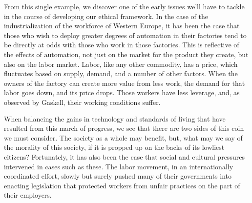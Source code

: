 \cite{marx1867strife}

From this single example, we discover one of the early issues we'll 
have to tackle in the course of developing our ethical framework.  
In the case of the industrialization of the workforce of Western 
Europe, it has been the case that those who wish to deploy greater 
degrees of automation in their factories tend to be directly at odds 
with those who work in those factories.  This is reflective of 
the effects of automation, not just on the market for the product they 
create, but also on the labor market.  Labor, like any other commodity, 
has a price, which fluctuates based on supply, demand, and a number of 
other factors.  When the owners of the factory can create more value 
from less work, the demand for that labor goes down, and its price 
drops.  Those workers have less leverage, and, as observed by Gaskell, 
their working conditions suffer.

When balancing the gains in technology and standards of living that 
have resulted from this march of progress, we see that there are two 
sides of this coin we must consider.  The society as a whole may 
benefit, but, what may we say of the morality of this society, if it 
is propped up on the backs of its lowliest citizens?  Fortunately, it 
has also been the case that social and cultural pressures intervened 
in cases such as these.  The labor movement, in an internationally 
coordinated effort, slowly but surely pushed many of their governments 
into enacting legislation that protected workers from unfair practices 
on the part of their employers.

